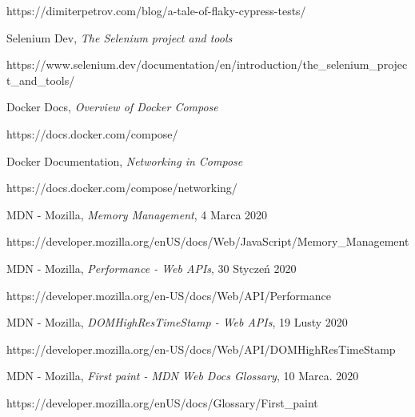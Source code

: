 \begin{thebibliography}{99}
https://dimiterpetrov.com/blog/a-tale-of-flaky-cypress-tests/

Selenium Dev,
\textit{The Selenium project and tools}

https://www.selenium.dev/documentation/en/introduction/the\_selenium\_project\_and\_tools/

Docker Docs,
\textit{Overview of Docker Compose}

https://docs.docker.com/compose/

Docker Documentation,
\textit{Networking in Compose}

https://docs.docker.com/compose/networking/

MDN - Mozilla,
\textit{Memory Management},
4 Marca 2020

https://developer.mozilla.org/en\-US/docs/Web/JavaScript/Memory\_Management

MDN - Mozilla,
\textit{Performance - Web APIs},
30 Styczeń 2020

https://developer.mozilla.org/en-US/docs/Web/API/Performance

MDN - Mozilla,
\textit{DOMHighResTimeStamp - Web APIs},
19 Lusty 2020

https://developer.mozilla.org/en-US/docs/Web/API/DOMHighResTimeStamp

MDN - Mozilla,
\textit{First paint - MDN Web Docs Glossary},
10 Marca. 2020

https://developer.mozilla.org/en\-US/docs/Glossary/First\_paint


\end{thebibliography}


